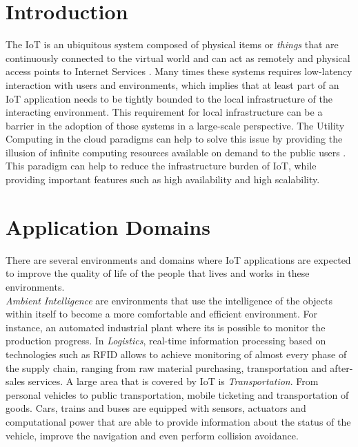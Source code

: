 

\section{Introduction}
\label{sec:introduction}
The \gls{IoT} is an ubiquitous system composed of physical items or \textit{things} that are continuously
connected to the virtual world and can act as remotely and physical access points to Internet Services \cite{mattern2010internet}.
Many times these systems requires low-latency interaction with users and environments, which implies
that at least part of an \gls{IoT} application needs to be tightly bounded to the local infrastructure
of the interacting environment. This requirement for local infrastructure can be a barrier in the
adoption of those systems in a large-scale perspective. The Utility Computing in the cloud paradigms
can help to solve this issue by providing the illusion of infinite computing resources available on
demand to the public users \cite{armbrust2010view}. This paradigm can help to reduce the infrastructure
burden of \gls{IoT}, while providing important features such as high availability and high scalability.

\section{Application Domains}
\label{sec:application_domains}
There are several environments and domains where \gls{IoT} applications are expected
to improve the quality of life of the people that lives and works in these environments.\\

\textit{Ambient Intelligence} are environments that use the intelligence of the objects within itself to
become a more comfortable and efficient environment. For instance, an automated industrial plant
where its is possible to monitor the production progress.
In \textit{Logistics}, real-time information processing based on technologies such as \gls{RFID} allows to
achieve monitoring of almost every phase of the supply chain, ranging from raw material purchasing,
transportation and after-sales services.
A large area that is covered by \gls{IoT} is \textit{Transportation}. From personal vehicles to public transportation,
mobile ticketing and transportation of goods. Cars, trains and buses are equipped with sensors, actuators
and computational power that are able to provide information about the status of the vehicle, improve
the navigation and even perform collision avoidance.\\


